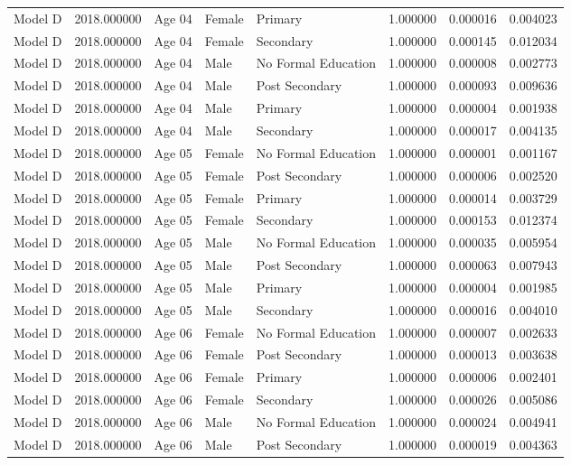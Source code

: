 \begin{table}[ht]
\begin{tabular}{lrlllrrr}
Model D & 2018.000000 & Age 04 & Female & Primary & 1.000000 & 0.000016 & 0.004023 \\
Model D & 2018.000000 & Age 04 & Female & Secondary & 1.000000 & 0.000145 & 0.012034 \\
Model D & 2018.000000 & Age 04 & Male & No Formal Education & 1.000000 & 0.000008 & 0.002773 \\
Model D & 2018.000000 & Age 04 & Male & Post Secondary & 1.000000 & 0.000093 & 0.009636 \\
Model D & 2018.000000 & Age 04 & Male & Primary & 1.000000 & 0.000004 & 0.001938 \\
Model D & 2018.000000 & Age 04 & Male & Secondary & 1.000000 & 0.000017 & 0.004135 \\
Model D & 2018.000000 & Age 05 & Female & No Formal Education & 1.000000 & 0.000001 & 0.001167 \\
Model D & 2018.000000 & Age 05 & Female & Post Secondary & 1.000000 & 0.000006 & 0.002520 \\
Model D & 2018.000000 & Age 05 & Female & Primary & 1.000000 & 0.000014 & 0.003729 \\
Model D & 2018.000000 & Age 05 & Female & Secondary & 1.000000 & 0.000153 & 0.012374 \\
Model D & 2018.000000 & Age 05 & Male & No Formal Education & 1.000000 & 0.000035 & 0.005954 \\
Model D & 2018.000000 & Age 05 & Male & Post Secondary & 1.000000 & 0.000063 & 0.007943 \\
Model D & 2018.000000 & Age 05 & Male & Primary & 1.000000 & 0.000004 & 0.001985 \\
Model D & 2018.000000 & Age 05 & Male & Secondary & 1.000000 & 0.000016 & 0.004010 \\
Model D & 2018.000000 & Age 06 & Female & No Formal Education & 1.000000 & 0.000007 & 0.002633 \\
Model D & 2018.000000 & Age 06 & Female & Post Secondary & 1.000000 & 0.000013 & 0.003638 \\
Model D & 2018.000000 & Age 06 & Female & Primary & 1.000000 & 0.000006 & 0.002401 \\
Model D & 2018.000000 & Age 06 & Female & Secondary & 1.000000 & 0.000026 & 0.005086 \\
Model D & 2018.000000 & Age 06 & Male & No Formal Education & 1.000000 & 0.000024 & 0.004941 \\
Model D & 2018.000000 & Age 06 & Male & Post Secondary & 1.000000 & 0.000019 & 0.004363 \\

\end{tabular}
\end{table}
